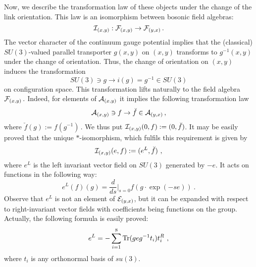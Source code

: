 \documentclass[a4paper,12pt]{article}
\begin{document}
\vspace{0.2cm} \noindent Now, we describe the transformation law
of these objects under the change of the link orientation. This
law is an isomorphism between bosonic field algebras:
\begin{equation}
\label{izo-I} {\cal I}_{(x,y)} : {\cal F}_{(x,y)} \rightarrow
{\cal F}_{(y,x)} \, .
\end{equation}
The vector character of the continuum gauge potential implies that
the (classical) $SU(3)$-valued parallel transporter $g(x,y)$ on
$(x,y)$ transforms to $g^{-1}(x,y)$ under the change of
orientation. Thus, the change of orientation on $(x,y)$ induces
the transformation
\begin{equation}
\label{inverse} SU(3) \ni g \rightarrow i(g) = g^{-1} \in SU(3)
\end{equation}
on configuration space. This transformation lifts naturally to the
field algebra ${\cal F}_{(x,y)} \, .$ Indeed, for elements of
${\cal A}_{(x,y)}$ it implies the following transformation law
\begin{equation}
\label{izo-f} {\cal A}_{(x,y)} \ni f \rightarrow  \breve{f}  \in
{\cal A}_{(y,x)} \, ,
\end{equation}
where $\breve{f}(g) := f(g^{-1}) \, .$ We thus put ${\cal
I}_{(x,y)}(0,f) := (0, \breve{f} )$. It may be easily proved that
the unique $*$-isomorphism, which fulfils this requirement is
given by
\begin{equation}
\label{izo-I1} {\cal I}_{(x,y)}(e,f) := (e^L, \breve{f} ) \ ,
\end{equation}
where $e^L$ is the left invariant vector field on $SU(3)$
generated by $-e$. It acts on functions in the following way:
\begin{equation}\label{l-derivative}
    e^L(f)(g) = \frac d{ds}{\Big |}_{s=0} f(g \cdot \exp (-se)) \ .
\end{equation}
Observe that $e^L$ is not an element of ${\cal E}_{(y,x)}$, but it
can be expanded with respect to right-invariant vector fields with
coefficients being functions on the group. Actually, the following
formula is easily proved:
\begin{equation}\label{L-R}
  e^L = - \sum_{i=1}^8 \mbox{\rm Tr}(g e g^{-1} t_i ) t^R_i \ ,
\end{equation}
where $t_i$ is any orthonormal basis of $su(3)$.
\end{document}
